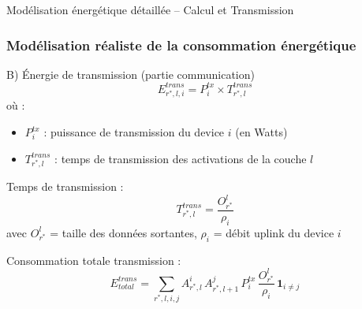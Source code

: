\documentclass[aspectratio=169]{beamer}
\begin{document}
\begin{frame}{Modélisation énergétique détaillée – Calcul et Transmission}
\frametitle{Modélisation réaliste de la consommation énergétique}

\begin{block}{B) Énergie de transmission (partie communication)}
\[
E^{trans}_{r^*,l,i} = P_i^{tx} \times T^{trans}_{r^*,l}
\]
où :
\begin{itemize}
    \item $P_i^{tx}$ : puissance de transmission du device $i$ (en Watts)
    \item $T^{trans}_{r^*,l}$ : temps de transmission des activations de la couche $l$
\end{itemize}

Temps de transmission :
\[
T^{trans}_{r^*,l} = \frac{O^l_{r^*}}{\rho_i}
\]
avec $O^l_{r^*}$ = taille des données sortantes, $\rho_i$ = débit uplink du device $i$

Consommation totale transmission :
\[
E^{trans}_{total} = \sum_{r^*,l,i,j} A^i_{r^*,l} \, A^j_{r^*,l+1} \, P_i^{tx} \, \frac{O^l_{r^*}}{\rho_i} \, \mathbf{1}_{i \neq j}
\]
\end{block}
\end{frame}
\end{document}

